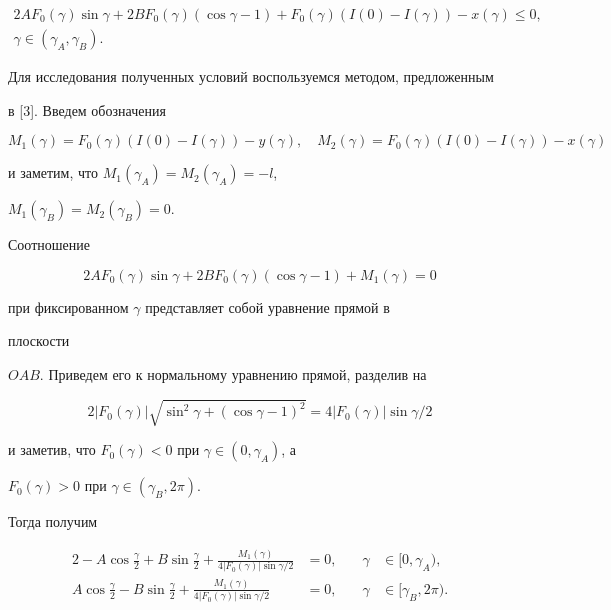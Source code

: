 \begin{equation} 


\begin{array}{c} 


2AF_0(\gamma)\sin\gamma+2BF_0(\gamma)(\cos\gamma-1)+ 


F_0(\gamma)(I(0)-I(\gamma))-x(\gamma)\le0, \\[2mm] 


\gamma\in(\gamma_A,\gamma_B). 


\end{array} 


\end{equation} 


Для исследования полученных условий воспользуемся методом, предложенным 


в [3]. Введем обозначения 


$$ 


M_1(\gamma)=F_0(\gamma)(I(0)-I(\gamma))-y(\gamma),\quad 


M_2(\gamma)=F_0(\gamma)(I(0)-I(\gamma))-x(\gamma) 


$$ 


и заметим, что $M_1(\gamma_A)=M_2(\gamma_A)=-l$, 


$M_1(\gamma_B)=M_2(\gamma_B)=0$. 


Соотношение 


$$ 


2AF_0(\gamma)\sin\gamma+2BF_0(\gamma)(\cos\gamma-1)+M_1(\gamma)=0 


$$ 


при фиксированном $\gamma$ представляет собой уравнение прямой в 


плоскости  


$OAB$. Приведем его к нормальному уравнению прямой, разделив на 


$$ 


2|F_0(\gamma)| 


\sqrt{\sin^2\gamma+(\cos\gamma-1)^2}= 


4|F_0(\gamma)|\sin\gamma/2 


$$ 


и заметив, что $F_0(\gamma)<0$ при $\gamma\in(0,\gamma_A)$, а 


$F_0(\gamma)>0$ при $\gamma\in(\gamma_B,2\pi)$. 


Тогда получим 


\begin{alignat*}{2} 


-A\cos\frac{\gamma}{2}+B\sin\frac{\gamma}{2}+ 


\frac{M_1(\gamma)}{4|F_0(\gamma)|\sin\gamma/2}&=0, &\quad 


\gamma&\in[0,\gamma_A), \\ 


% 


A\cos\frac{\gamma}{2}-B\sin\frac{\gamma}{2}+ 


\frac{M_1(\gamma)}{4|F_0(\gamma)|\sin\gamma/2}&=0, &\quad 


\gamma&\in[\gamma_B,2\pi). 


\end{alignat*} 


